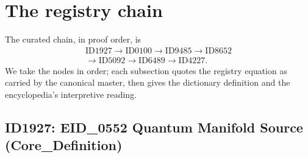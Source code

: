 \documentclass[11pt]{article}
\theoremstyle{remark}
\begin{document}
\section{The registry chain}
\label{sec:chain}

The curated chain, in proof order, is
\begin{equation*}
\begin{gathered}
\text{ID1927} \to \text{ID0100} \to \text{ID9485} \to \text{ID8652} \\
\to \text{ID5092} \to \text{ID6489} \to \text{ID4227}.
\end{gathered}
\end{equation*}
We take the nodes in order; each subsection quotes the registry equation as carried by the canonical master, then gives the dictionary definition and the encyclopedia's interpretive reading.

\subsection{ID1927: EID\_0552 Quantum Manifold Source (Core\_Definition)}
\end{document}
